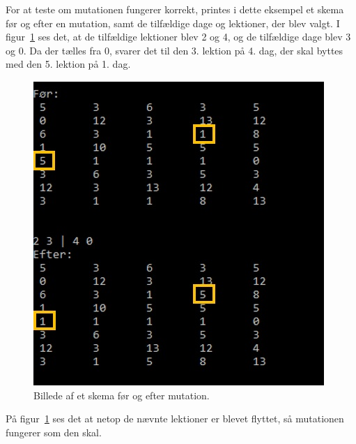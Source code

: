 For at teste om mutationen fungerer korrekt, printes i dette eksempel et skema før og efter en mutation, samt de tilfældige dage og lektioner, der blev valgt. I figur~\ref{fig:mutationsbevis} ses det, at de tilfældige lektioner blev 2 og 4, og de tilfældige dage blev 3 og 0. Da der tælles fra 0, svarer det til den 3. lektion på 4. dag, der skal byttes med den 5. lektion på 1. dag.

\begin{figure}[!ht]
\includegraphics[width = \textwidth]{partials/graphics/mutationbevis.png}
\caption{Billede af et skema før og efter mutation.}
\label{fig:mutationsbevis}
\end{figure}

På figur~\ref{fig:mutationsbevis} ses det at netop de nævnte lektioner er blevet flyttet, så mutationen fungerer som den skal.